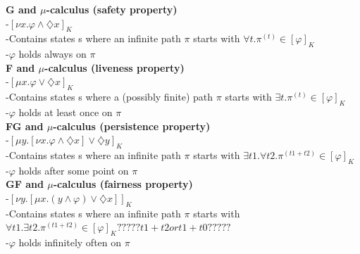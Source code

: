 \documentclass{article}
\begin{document}
\begin{multicols}{4}
\textbf{G and $\mu$-calculus (safety property)} \\
-$[\nu x. \varphi \wedge \diamondsuit x]_{K} $ \\
-Contains states s where an infinite path $\pi$ starts with $\forall t. \pi^{(t)} \in [\varphi]_{K}$ \\
-$\varphi$ holds always on $\pi$ \\
\textbf{F and $\mu$-calculus (liveness property)} \\
-$[\mu x. \varphi \vee \diamondsuit x]_{K} $ \\
-Contains states s where a (possibly finite) path $\pi$ starts with $\exists t. \pi^{(t)} \in [\varphi]_{K}$ \\
-$\varphi$ holds at least once on $\pi$ \\
\textbf{FG and $\mu$-calculus (persistence property)} \\
-$[\mu y.[\nu x. \varphi \wedge \diamondsuit x] \vee \diamondsuit y]_{K} $ \\
-Contains states s where an infinite path $\pi$ starts with $\exists t1.\forall t2. \pi^{(t1+t2)} \in [\varphi]_{K}$ \\
-$\varphi$ holds after some point on $\pi$ \\
\textbf{GF and $\mu$-calculus (fairness property)} \\
-$[\nu y.[\mu x. (y \wedge \varphi) \vee \diamondsuit x]]_{K} $ \\
-Contains states s where an infinite path $\pi$ starts with $\forall t1.\exists t2. \pi^{(t1+t2)} \in [\varphi]_{K} ?????t1+t2 or t1+t0?????$ \\
-$\varphi$ holds infinitely often on $\pi$ \\

\end{multicols}
\end{document}
